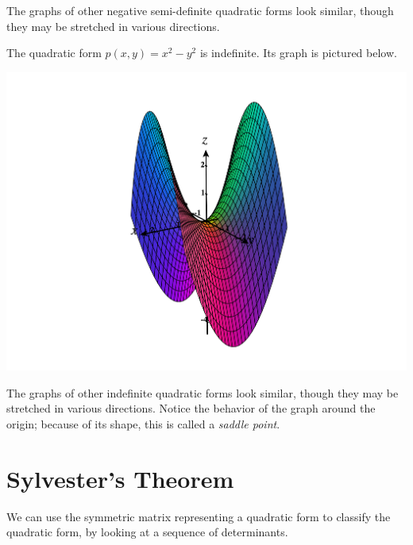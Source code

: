 \documentclass{ximera}
\begin{document}
\begin{example}
The graphs of other negative semi-definite quadratic forms look similar, though they may be stretched in various directions.

The quadratic form $p(x,y) = x^2-y^2$ is indefinite. Its graph is pictured below.

\begin{image}
\includegraphics[width=\textwidth]{CalcPlot3D-indef}
\end{image}

The graphs of other indefinite quadratic forms look similar, though they may be stretched in various directions. Notice the behavior of the graph around the origin; because of its shape, this is called a \emph{saddle point}.

\end{example}

\section*{Sylvester's Theorem}

We can use the symmetric matrix representing a quadratic form to classify the quadratic form, by looking at a sequence of determinants.
\end{document}
